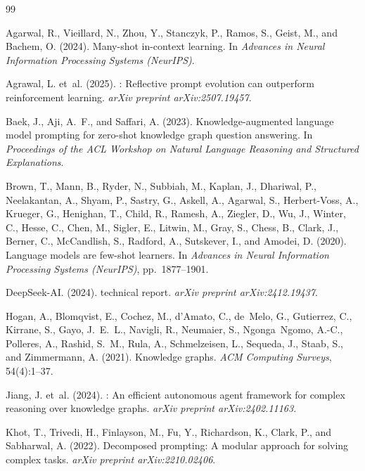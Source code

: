 \documentclass[12pt,a4paper,oneside]{article}
\begin{document}
\begin{thebibliography}{99}

Agarwal, R., Vieillard, N., Zhou, Y., Stanczyk, P., Ramos, S., Geist, M., and Bachem, O. (2024).
\newblock Many-shot in-context learning.
\newblock In \textit{Advances in Neural Information Processing Systems (NeurIPS)}.

Agrawal, L. et~al. (2025).
: Reflective prompt evolution can outperform reinforcement learning.
\newblock \textit{arXiv preprint arXiv:2507.19457}.

Baek, J., Aji, A.~F., and Saffari, A. (2023).
\newblock Knowledge-augmented language model prompting for zero-shot knowledge graph question answering.
\newblock In \textit{Proceedings of the ACL Workshop on Natural Language Reasoning and Structured Explanations}.

Brown, T., Mann, B., Ryder, N., Subbiah, M., Kaplan, J., Dhariwal, P., Neelakantan, A., Shyam, P., Sastry, G., Askell, A., Agarwal, S., Herbert-Voss, A., Krueger, G., Henighan, T., Child, R., Ramesh, A., Ziegler, D., Wu, J., Winter, C., Hesse, C., Chen, M., Sigler, E., Litwin, M., Gray, S., Chess, B., Clark, J., Berner, C., McCandlish, S., Radford, A., Sutskever, I., and Amodei, D. (2020).
\newblock Language models are few-shot learners.
\newblock In \textit{Advances in Neural Information Processing Systems (NeurIPS)}, pp.~1877--1901.

DeepSeek-AI. (2024).
 technical report.
\newblock \textit{arXiv preprint arXiv:2412.19437}.

Hogan, A., Blomqvist, E., Cochez, M., d'Amato, C., de~Melo, G., Gutierrez, C., Kirrane, S., Gayo, J.~E.~L., Navigli, R., Neumaier, S., Ngonga~Ngomo, A.-C., Polleres, A., Rashid, S.~M., Rula, A., Schmelzeisen, L., Sequeda, J., Staab, S., and Zimmermann, A. (2021).
\newblock Knowledge graphs.
\newblock \textit{ACM Computing Surveys}, 54(4):1--37.

Jiang, J. et~al. (2024).
: An efficient autonomous agent framework for complex reasoning over knowledge graphs.
\newblock \textit{arXiv preprint arXiv:2402.11163}.

Khot, T., Trivedi, H., Finlayson, M., Fu, Y., Richardson, K., Clark, P., and Sabharwal, A. (2022).
\newblock Decomposed prompting: A modular approach for solving complex tasks.
\newblock \textit{arXiv preprint arXiv:2210.02406}.


\end{thebibliography}
\end{document}
